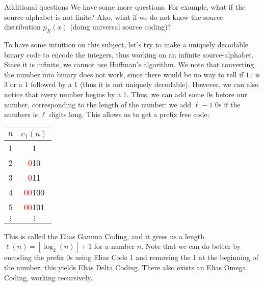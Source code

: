 \documentclass[a4paper]{article}
\begin{document}
\begin{parag}{Additional questions}
    We have some more questions. For example, what if the source-alphabet is not finite? Also, what if we do not know the source distribution $p_X\left(x\right)$ (doing universal source coding)?

    To have some intuition on this subject, let's try to make a uniquely decodable binary code to encode the integers, thus working on an infinite source-alphabet. Since it is infinite, we cannot use Huffman's algorithm. We note that converting the number into binary does not work, since there would be no way to tell if $11$ is 3 or a 1 followed by a 1 (thus it is not uniquely decodable). However, we can also notice that every number begins by a 1. Thus, we can add some 0s before our number, corresponding to the length of the number: we add $\ell - 1$ 0s if the numbers is $\ell$ digits long. This allows us to get a prefix free code:
    \begin{center}
    \begin{tabular}{c|c}
        $n$ & $c_1\left(n\right)$ \\
        \hline
        1 & 1 \\
        2 & \textcolor{red}{0}10 \\
        3 & \textcolor{red}{0}11 \\
        4 & \textcolor{red}{00}100 \\
        5 & \textcolor{red}{00}101 \\
        $\vdots$ & $\vdots$
    \end{tabular}
    \end{center}

    This is called the Elias Gamma Coding, and it gives us a length $\ell\left(n\right) = \left\lfloor \log_{2}\left(n\right) \right\rfloor + 1$ for a number $n$. Note that we can do better by encoding the prefix 0s using Elias Code 1 and removing the 1 at the beginning of the number; this yields Elias Delta Coding. There also exists an Elias Omega Coding, working recursively.
\end{parag}
\end{document}
